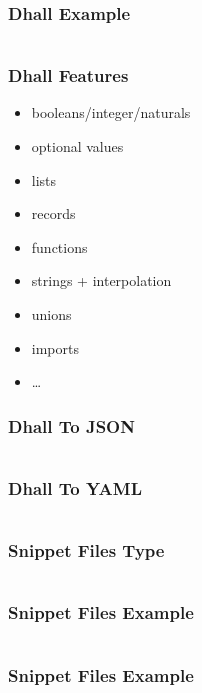 \documentclass{beamer}
\begin{document}
\begin{frame}
  \frametitle{Dhall Example}
  \inputminted[autogobble]{haskell}{dhall/example.dhall}
\end{frame}

\begin{frame}
  \frametitle{Dhall Features}
  \begin{itemize}
  \item booleans/integer/naturals
  \item optional values
  \item lists
  \item records
  \item functions
  \item strings + interpolation
  \item unions
  \item imports
  \item \ldots{}
  \end{itemize}
\end{frame}

\begin{frame}
  \frametitle{Dhall To JSON}
  \inputminted[autogobble]{json}{dhall/example.json}
\end{frame}

\begin{frame}
  \frametitle{Dhall To YAML}
  \inputminted[autogobble]{yaml}{dhall/example.yaml}
\end{frame}

\begin{frame}
  \frametitle{Snippet Files \textemdash{} Type}
  \begin{center}
    \inputminted{text}{snippets/snippet-type.dhall}
  \end{center}
\end{frame}

\begin{frame}
  \frametitle{Snippet Files \textemdash{} Example}
  \begin{center}
    \inputminted{text}{snippets/snippet-type.snippet}
  \end{center}
\end{frame}

\begin{frame}
  \frametitle{Snippet Files \textemdash{} Example}
  \begin{center}
    \inputminted{text}{snippets/pdf-rule.snippet}
  \end{center}
\end{frame}
\end{document}
